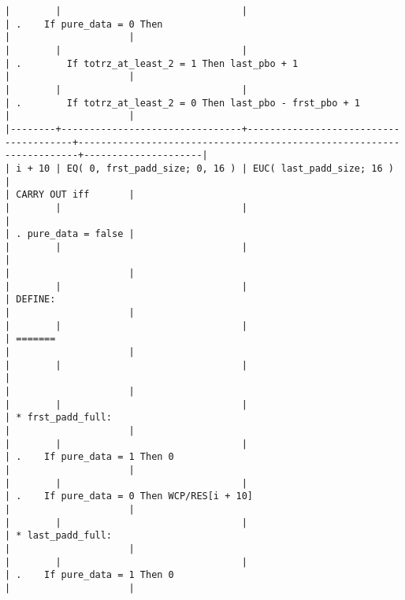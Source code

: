 \documentclass[varwidth=\maxdimen,margin=0.5cm,multi={verbatim}]{standalone}
\begin{document}
\begin{verbatim}
|        |                                |                                       | .    If pure_data = 0 Then                                           |                     |
|        |                                |                                       | .        If totrz_at_least_2 = 1 Then last_pbo + 1                   |                     |
|        |                                |                                       | .        If totrz_at_least_2 = 0 Then last_pbo - frst_pbo + 1        |                     |
|--------+--------------------------------+---------------------------------------+----------------------------------------------------------------------+---------------------|
| i + 10 | EQ( 0, frst_padd_size; 0, 16 ) | EUC( last_padd_size; 16 )             |                                                                      | CARRY OUT iff       |
|        |                                |                                       |                                                                      | . pure_data = false |
|        |                                |                                       |                                                                      |                     |
|        |                                |                                       | DEFINE:                                                              |                     |
|        |                                |                                       | =======                                                              |                     |
|        |                                |                                       |                                                                      |                     |
|        |                                |                                       | * frst_padd_full:                                                    |                     |
|        |                                |                                       | .    If pure_data = 1 Then 0                                         |                     |
|        |                                |                                       | .    If pure_data = 0 Then WCP/RES[i + 10]                           |                     |
|        |                                |                                       | * last_padd_full:                                                    |                     |
|        |                                |                                       | .    If pure_data = 1 Then 0                                         |                     |

\end{verbatim}
\end{document}
